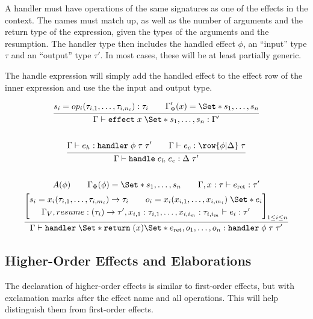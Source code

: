\documentclass{article}
\newcommand\kw[1]{\mathbf{\mathtt{#1}}\;}
\newcommand\handler{\kw{handler}}
\newcommand\return[0]{\kw{return}}
\newcommand\handle[2]{\kw{handle} #1\;#2}
\renewcommand\S{\Set*}
\let\oldinfer\infer
\renewcommand\infer[2]{\oldinfer{#1}{\begin{gathered}#2\end{gathered}}}
\begin{document}
A handler must have operations of the same signatures as one of the effects in the context. The names must match up, as well as the number of arguments and the return type of the expression, given the types of the arguments and the resumption. The handler type then includes the handled effect $\phi$, an ``input'' type $\tau$ and an ``output'' type $\tau'$. In most cases, these will be at least partially generic.

The handle expression will simply add the handled effect to the effect row of the inner expression and use the the input and output type.

\begin{gather*}
    \infer{
        \Gamma \vdash \kw{effect} x\;\S{s_1, \dots, s_n}: \Gamma'
    }{
        s_i = op_i(\tau_{i,1},\dots, \tau_{i,n_i}): \tau_i
        \qquad
        \Gamma'_\Phi(x) = \S{s_1, \dots, s_n}
    }
    \\\\
    \infer{
        \Gamma \vdash \handle{e_h}{e_c} : \Delta\;\tau'
    }{
        \Gamma \vdash e_h : \handler \phi\;\tau\;\tau'
        \qquad
        \Gamma \vdash e_c : \row{\phi | \Delta}\;\tau
    }
    \\\\
    \infer{
        \Gamma \vdash \handler \S{ \return(x) \S{ e_{\text{ret}} }, o_1, \dots, o_n }
        : \handler \phi\;\tau\;\tau'
    }{
        A(\phi)
        \qquad
        \Gamma_\Phi(\phi) = \S{ s_1, \dots, s_n }
        \qquad
        \Gamma, x: \tau \vdash e_{\text{ret}} : \tau' 
        \\
        \left[
            \begin{gathered}
                s_i = x_i(\tau_{i,1}, \dots, \tau_{i,m_i}) \to \tau_i
                \qquad
                o_i = x_i(x_{i,1}, \dots, x_{i,m_i})\;\S{ e_i }
                \\
                \Gamma_V, resume : (\tau_i) \to \tau', x_{i,1}: \tau_{i,1}, \dots, x_{i,i_m}: \tau_{i,i_m} 
                \vdash e_i: \tau'
            \end{gathered}
        \right]_{1\leq i\leq n}
    }
\end{gather*}

\subsection{Higher-Order Effects and Elaborations}

The declaration of higher-order effects is similar to first-order effects, but with exclamation marks after the effect name and all operations. This will help distinguish them from first-order effects.
\end{document}

